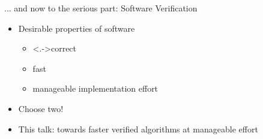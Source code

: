 \documentclass[fleqn]{beamer}
\begin{document}
\begin{frame}{... and now to the serious part: Software Verification}

  \begin{itemize}
   \item<+-> Desirable properties of software
    \begin{itemize}
     \item<+-> \onslide<.->{correct}
     \item<+-> fast
     \item<+-> manageable implementation effort
    \end{itemize}
   \item<+-> Choose two!
   \item<+-> This talk: towards faster verified algorithms at manageable effort

  \end{itemize}
\end{frame}
\def\algoAugment{
  \begin{algorithmic}
    \Procedure{augment}{$g,f,p$}
      \State{$c_p \gets \min\{ g_f(u,v) \mid (u,v)\in p \}$}
      \ForAll{$(u,v)\in p$}
        \If{$(u,v)\in g$}~$f(u,v)\gets f(u,v) + c_p$
        \Else~$f(v,u)\gets f(v,u) - c_p$
        \EndIf
      \EndFor
      \Return{$f$}
    \EndProcedure
  \end{algorithmic}
}

\def\algoEdka{
  \begin{algorithmic}
    \Procedure{Edmonds-Karp}{$g,s,t$}
      \State{$f\gets \lambda(u,v).~0$}
      \While{exists augmenting path in $g_f$}
        \State{$p \gets {}$ shortest augmenting path}
        \State{$f \gets $\Call{augment}{$g,f,p$}}
      \EndWhile
    \EndProcedure
  \end{algorithmic}
}
\end{document}
